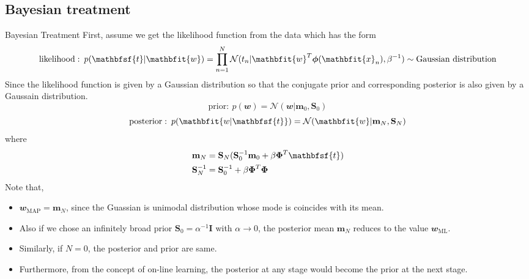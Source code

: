 \documentclass{bredelebeamer}
\begin{document}
\subsection{Bayesian treatment}
\begin{frame}{Bayesian Treatment}
  First, assume we get the likelihood function from the data which has the form
  \begin{equation}
    \begin{split}
      \textrm{likelihood}:\: p(\mathbfsf{t}|\mathbfit{w})
      = \prod_{n=1}^{N} \mathcal{N}(t_n|\mathbfit{w}^T \boldsymbol{\phi}(\mathbfit{x}_n), \beta^{-1})
      \sim \textrm{Gaussian distribution}
    \end{split}
  \end{equation}
  Since the likelihood function is given by a Gaussian distribution so that the
  conjugate prior and corresponding posterior is also given by a Gaussain
  distribution.
  \begin{equation}
    \textrm{prior}:\: p(\mathbfit{w}) = \mathcal{N}(\mathbfit{w}|\mathbf{m}_0, \mathbf{S}_0)
  \end{equation}
  \begin{equation}
    \textrm{posterior}:\: p(\mathbfit{w|\mathbfsf{t}})
    = \mathcal{N}(\mathbfit{w}|\mathbf{m}_N, \mathbf{S}_N)
  \end{equation}
  where
  \begin{equation}
    \begin{split}
      \mathbf{m}_N &= \mathbf{S}_N (\mathbf{S}_{0}^{-1} \mathbf{m}_0 + \beta \boldsymbol{\Phi}^T \mathbfsf{t})\\
      \mathbf{S}_{N}^{-1} &= \mathbf{S}_{0}^{-1} + \beta \boldsymbol{\Phi}^T \boldsymbol{\Phi}
    \end{split}
  \end{equation}
  Note that,
  \begin{itemize}
    \item $\mathbfit{w}_{\textrm{MAP}} = \mathbf{m}_N$, since the Guassian is
    unimodal distribution whose mode is coincides with its mean.
    \item Also if we chose an infinitely broad prior $\mathbf{S}_0 = \alpha^{-1}\mathbf{I}$
    with $\alpha \rightarrow 0$, the posterior mean $\mathbf{m}_N$ reduces to
    the value $\mathbfit{w}_{\textrm{ML}}$.
    \item Similarly, if $N=0$, the posterior and prior are same.
    \item Furthermore, from the concept of on-line learning, the posterior at
    any stage would become the prior at the next stage.
  \end{itemize}


\end{frame}
\end{document}
